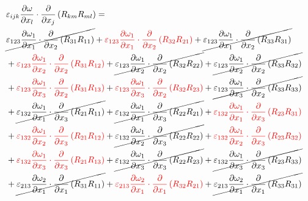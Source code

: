 \begin{equation}
	\begin{split}
		 & \varepsilon_{ijk}\pdv{\omega}{x_{l}} \cdot\pdv{}{x_{j}}\left(R_{km}R_{ml}\right) =  \\ 
		&\cancel{\varepsilon_{123}\pdv{\omega_{1}}{x_{1}}\cdot\pdv{}{x_{2}}\left(R_{31}R_{11}\right)
}		+{\color{red}\varepsilon_{123}\pdv{\omega_{1}}{x_{1}}\cdot\pdv{}{x_{2}}\left(R_{32}R_{21}\right)
}		+\cancel{\varepsilon_{123}\pdv{\omega_{1}}{x_{1}}\cdot\pdv{}{x_{2}}\left(R_{33}R_{31}\right)
}\\ 
		&+{\color{red}\varepsilon_{123}\pdv{\omega_{1}}{x_{2}}\cdot\pdv{}{x_{2}}\left(R_{31}R_{12}\right)
}		+\cancel{\varepsilon_{123}\pdv{\omega_{1}}{x_{2}}\cdot\pdv{}{x_{2}}\left(R_{32}R_{22}\right)
}		+\cancel{\varepsilon_{123}\pdv{\omega_{1}}{x_{2}}\cdot\pdv{}{x_{2}}\left(R_{33}R_{32}\right)
}\\ 
		&+{\color{red}\varepsilon_{123}\pdv{\omega_{1}}{x_{3}}\cdot\pdv{}{x_{2}}\left(R_{31}R_{13}\right)
}		+{\color{red}\varepsilon_{123}\pdv{\omega_{1}}{x_{3}}\cdot\pdv{}{x_{2}}\left(R_{32}R_{23}\right)
}		+\cancel{\varepsilon_{123}\pdv{\omega_{1}}{x_{3}}\cdot\pdv{}{x_{2}}\left(R_{33}R_{33}\right)
}\\ 
		&+\cancel{\varepsilon_{132}\pdv{\omega_{1}}{x_{1}}\cdot\pdv{}{x_{3}}\left(R_{21}R_{11}\right)
}		+\cancel{\varepsilon_{132}\pdv{\omega_{1}}{x_{1}}\cdot\pdv{}{x_{3}}\left(R_{22}R_{21}\right)
}		+{\color{red}\varepsilon_{132}\pdv{\omega_{1}}{x_{1}}\cdot\pdv{}{x_{3}}\left(R_{23}R_{31}\right)
}\\ 
		&+{\color{red}\varepsilon_{132}\pdv{\omega_{1}}{x_{2}}\cdot\pdv{}{x_{3}}\left(R_{21}R_{12}\right)
}		+\cancel{\varepsilon_{132}\pdv{\omega_{1}}{x_{2}}\cdot\pdv{}{x_{3}}\left(R_{22}R_{22}\right)
}		+{\color{red}\varepsilon_{132}\pdv{\omega_{1}}{x_{2}}\cdot\pdv{}{x_{3}}\left(R_{23}R_{32}\right)
}\\ 
		&+{\color{red}\varepsilon_{132}\pdv{\omega_{1}}{x_{3}}\cdot\pdv{}{x_{3}}\left(R_{21}R_{13}\right)
}		+\cancel{\varepsilon_{132}\pdv{\omega_{1}}{x_{3}}\cdot\pdv{}{x_{3}}\left(R_{22}R_{23}\right)
}		+\cancel{\varepsilon_{132}\pdv{\omega_{1}}{x_{3}}\cdot\pdv{}{x_{3}}\left(R_{23}R_{33}\right)
}\\ 
		&+\cancel{\varepsilon_{213}\pdv{\omega_{2}}{x_{1}}\cdot\pdv{}{x_{1}}\left(R_{31}R_{11}\right)
}		+{\color{red}\varepsilon_{213}\pdv{\omega_{2}}{x_{1}}\cdot\pdv{}{x_{1}}\left(R_{32}R_{21}\right)
}		+\cancel{\varepsilon_{213}\pdv{\omega_{2}}{x_{1}}\cdot\pdv{}{x_{1}}\left(R_{33}R_{31}\right)
}\\ 

\end{split}
\end{equation}
